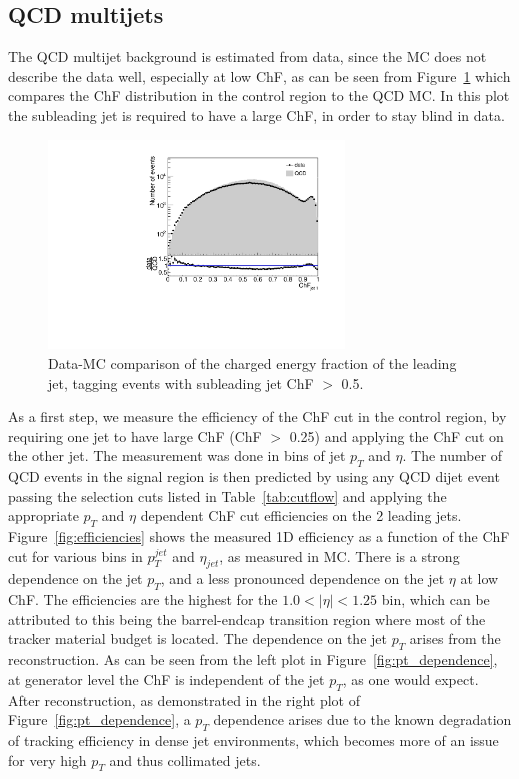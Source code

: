 \subsection{QCD multijets}

The QCD multijet background is estimated from data, since the MC does not describe the data well, especially at low ChF, as can be seen from Figure~\ref{fig:dataMC} which compares the ChF distribution in the control region to the QCD MC. In this plot the subleading jet is required to have a large ChF, in order to stay blind in data.

\begin{figure}[h]
  \centering
  \includegraphics[width=0.7\textwidth]{figures/bkgd_estimation_dataMC.pdf}\hfill%
  \caption{Data-MC comparison of the charged energy fraction of the leading jet, tagging events with subleading jet ChF $>$ 0.5.}
  \label{fig:dataMC}
\end{figure}

As a first step, we measure the efficiency of the ChF cut in the control region, by requiring one jet to have large ChF (ChF $>$ 0.25) and applying the ChF cut on the other jet. The measurement was done in bins of jet $p_T$ and $\eta$. The number of QCD events in the signal region is then predicted by using any QCD dijet event passing the selection cuts listed in Table~\ref{tab:cutflow} and applying the appropriate $p_T$ and $\eta$ dependent ChF cut efficiencies on the 2 leading jets. Figure~\ref{fig:efficiencies} shows the measured 1D efficiency as a function of the ChF cut for various bins in $p_T^{jet}$ and $\eta_{jet}$, as measured in MC. There is a strong dependence on the jet $p_T$, and a less pronounced dependence on the jet $\eta$ at low ChF. The efficiencies are the highest for the $1.0 < |\eta| < 1.25$ bin, which can be attributed to this being the barrel-endcap transition region where most of the tracker material budget is located. The dependence on the jet $p_T$ arises from the reconstruction. As can be seen from the left plot in Figure~\ref{fig:pt_dependence}, at generator level the ChF is independent of the jet $p_T$, as one would expect. After reconstruction, as demonstrated in the right plot of Figure~\ref{fig:pt_dependence}, a $p_T$ dependence arises due to the known degradation of tracking efficiency in dense jet environments, which becomes more of an issue for very high $p_T$ and thus collimated jets.

